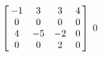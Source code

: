 {$\left[\hskip -3pt \begin{array}{cccc} -1&3&3&4\\  0&0&0&0
\\  4&-5&-2&0\\  0&0&2&0\end{array}\hskip -3pt \right]$} 
{$0$}



  


